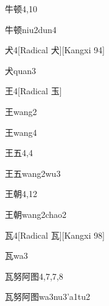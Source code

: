 \begin{entry}{牛顿}{4,10}
  \begin{phonetics}{牛顿}{niu2dun4}
  \end{phonetics}
\end{entry}

\begin{entry}{犬}{4}[Radical 犬][Kangxi 94]
  \begin{phonetics}{犬}{quan3}
  \end{phonetics}
\end{entry}

\begin{entry}{王}{4}[Radical 玉]
  \begin{phonetics}{王}{wang2}
  \end{phonetics}
  \begin{phonetics}{王}{wang4}
  \end{phonetics}
\end{entry}

\begin{entry}{王五}{4,4}
  \begin{phonetics}{王五}{wang2wu3}
  \end{phonetics}
\end{entry}

\begin{entry}{王朝}{4,12}
  \begin{phonetics}{王朝}{wang2chao2}
  \end{phonetics}
\end{entry}

\begin{entry}{瓦}{4}[Radical 瓦][Kangxi 98]
  \begin{phonetics}{瓦}{wa3}
  \end{phonetics}
\end{entry}

\begin{entry}{瓦努阿图}{4,7,7,8}
  \begin{phonetics}{瓦努阿图}{wa3nu3'a1tu2}
  \end{phonetics}
\end{entry}

